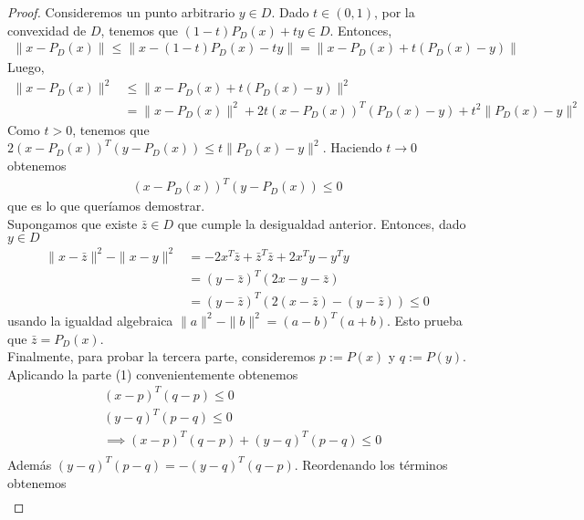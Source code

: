 \documentclass{article}
\begin{document}
\begin{proof}
  Consideremos un punto arbitrario \( y \in D \). Dado \( t \in (0, 1) \), por la convexidad de \( D \), tenemos que \( (1 - t)P_D(x) + ty \in D \). Entonces,\begin{align*}
    \| x - P_D(x) \|  \leq \| x - (1-t) P_D(x) - ty \| = \| x - P_D(x) + t (P_D(x) - y) \|
  \end{align*}
  Luego,\begin{align*}
    \| x - P_D(x) \|^2 & \leq \|x - P_D(x) + t (P_D(x) - y) \|^2                                          \\
                       & = \|x - P_D(x) \|^2 + 2t {(x - P_D(x))}^T (P_D(x) - y) + t^2 \| P_D(x) - y  \|^2
  \end{align*}
  Como \( t > 0 \), tenemos que \( 2 {(x - P_D(x))}^T (y - P_D(x)) \leq t \|P_D(x) - y \|^2 \). Haciendo \( t \to 0 \) obtenemos \begin{align*}
    {(x - P_D(x))}^T (y - P_D(x)) \leq 0
  \end{align*}
  que es lo que queríamos demostrar. \\
  Supongamos que existe \( \bar{z} \in D \) que cumple la desigualdad anterior. Entonces, dado \( y \in D \) \begin{align*}
    \| x - \bar{z} \|^2 - \| x - y \|^2 & = -2 x^T \bar{z} + \bar{z}^T \bar{z} + 2 x^T y - y^T y      \\
                                        & = {( y - \bar{z})}^T (2x - y - \bar{z})                     \\
                                        & = {(y - \bar{z})}^T (2(x - \bar{z}) - (y - \bar{z})) \leq 0
  \end{align*}
  usando la igualdad algebraica \( \| a \|^2 - \| b \|^2 = {(a-b)}^T (a+b) \). Esto prueba que \( \bar{z} = P_D(x) \). \\
  Finalmente, para probar la tercera parte, consideremos \( p := P(x) \) y \( q := P(y) \). Aplicando la parte (1) convenientemente obtenemos \begin{align*}
     & {(x - p)}^T (q - p) \leq 0                      \\
     & {(y - q)}^T (p - q) \leq 0                      \\
     & \implies {(x-p)}^T(q-p) + {(y-q)}^T(p-q) \leq 0 \\
  \end{align*}
  Además \( {(y-q)}^T(p-q) = -{(y-q)}^T(q-p) \). Reordenando los términos obtenemos \begin{align*}

\end{align*}
\end{proof}
\end{document}
